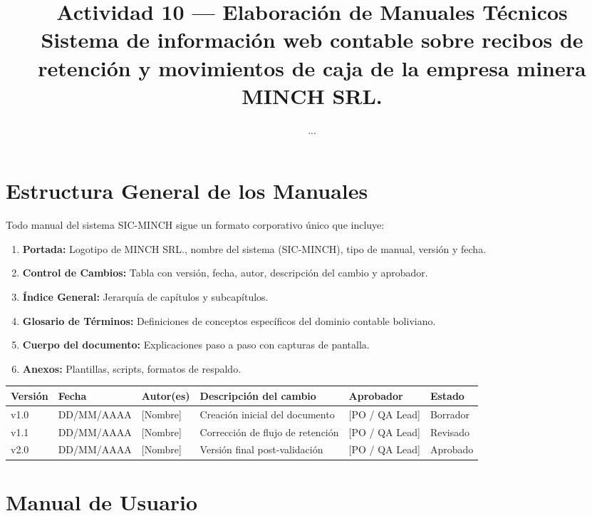 \documentclass[stu]{apa7}
\title{Actividad 10 --- Elaboración de Manuales Técnicos \\ Sistema de información web contable sobre recibos de retención y movimientos de caja de la empresa minera MINCH SRL.}
\author{...}
\affiliation{...}
\begin{document}
\maketitle

\section*{Estructura General de los Manuales}

Todo manual del sistema SIC-MINCH sigue un formato corporativo único que incluye:

\begin{enumerate}
    \item \textbf{Portada:} Logotipo de MINCH SRL., nombre del sistema (SIC-MINCH), tipo de manual, versión y fecha.
    \item \textbf{Control de Cambios:} Tabla con versión, fecha, autor, descripción del cambio y aprobador.
    \item \textbf{Índice General:} Jerarquía de capítulos y subcapítulos.
    \item \textbf{Glosario de Términos:} Definiciones de conceptos específicos del dominio contable boliviano.
    \item \textbf{Cuerpo del documento:} Explicaciones paso a paso con capturas de pantalla.
    \item \textbf{Anexos:} Plantillas, scripts, formatos de respaldo.
\end{enumerate}

\begin{longtable}{|C{1.5cm}|C{2.5cm}|L{2.5cm}|L{3.5cm}|L{2.5cm}|C{2cm}|}
\hline
{}
\textbf{Versión} & \textbf{Fecha} & \textbf{Autor(es)} & \textbf{Descripción del cambio} & \textbf{Aprobador} & \textbf{Estado} \\
\hline
v1.0 & DD/MM/AAAA & [Nombre] & Creación inicial del documento & [PO / QA Lead] & Borrador \\
\hline
v1.1 & DD/MM/AAAA & [Nombre] & Corrección de flujo de retención & [PO / QA Lead] & Revisado \\
\hline
v2.0 & DD/MM/AAAA & [Nombre] & Versión final post-validación & [PO / QA Lead] & Aprobado \\
\hline
\end{longtable}

\newpage

\section{Manual de Usuario}
\end{document}
